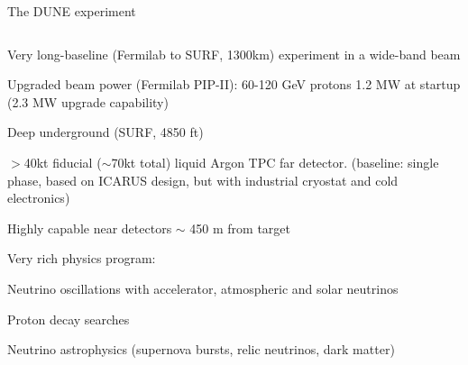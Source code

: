 \begin{frame}{The DUNE experiment}
\begin{columns}
  \begin{column}{0.50\textwidth}
   \begin{itemize}
   {\scriptsize
     \item Very long-baseline (Fermilab to SURF, 1300km) experiment in a wide-band beam
     \item Upgraded beam power (Fermilab PIP-II): 60-120 GeV protons
           1.2 MW at startup (2.3 MW upgrade capability)
     \item Deep underground (SURF, 4850 ft)
     \item $>$40kt fiducial ($\sim$70kt total) liquid Argon TPC far detector.
             (baseline: single phase, based on ICARUS design,
             but with industrial cryostat and cold electronics)
     \item Highly capable near detectors $\sim$ 450 m from target
     \item Very rich physics program:
        {\scriptsize
            \item Neutrino oscillations with accelerator, atmospheric and solar neutrinos
            \item Proton decay searches
            \item Neutrino astrophysics (supernova bursts, relic neutrinos, dark matter)
         }

}
\end{itemize}
\end{column}
\end{columns}
\end{frame}
